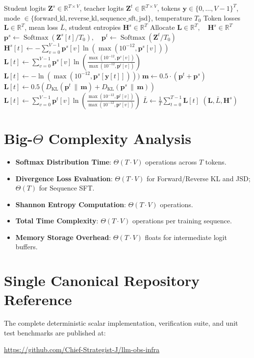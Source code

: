 \documentclass[11pt,a4paper]{article}
\theoremstyle{definition}
\begin{document}
\begin{algorithm}[H]
\caption{Autoregressive Sequence Distillation Stepwise Loss}
\begin{algorithmic}[1]
\Require Student logits $\mathbf{Z}^s \in \mathbb{R}^{T \times V}$, teacher logits $\mathbf{Z}^t \in \mathbb{R}^{T \times V}$, tokens $\mathbf{y} \in \{0, \dots, V-1\}^T$, mode $\in \{\text{forward\_kl}, \text{reverse\_kl}, \text{sequence\_sft}, \text{jsd}\}$, temperature $T_0$
\Ensure Token losses $\mathbf{L} \in \mathbb{R}^T$, mean loss $\bar{L}$, student entropies $\mathbf{H}^s \in \mathbb{R}^T$
\State Allocate $\mathbf{L} \in \mathbb{R}^T, \quad \mathbf{H}^s \in \mathbb{R}^T$
    \State $\mathbf{p}^s \gets \operatorname{Softmax}(\mathbf{Z}^s[t] / T_0), \quad \mathbf{p}^t \gets \operatorname{Softmax}(\mathbf{Z}^t / T_0)$
    \State $\mathbf{H}^s[t] \gets - \sum_{v=0}^{V-1} \mathbf{p}^s[v] \ln(\max(10^{-12}, \mathbf{p}^s[v]))$
        \State $\mathbf{L}[t] \gets \sum_{v=0}^{V-1} \mathbf{p}^s[v] \ln\left( \frac{\max(10^{-12}, \mathbf{p}^s[v])}{\max(10^{-12}, \mathbf{p}^t[v])} \right)$
        \State $\mathbf{L}[t] \gets - \ln(\max(10^{-12}, \mathbf{p}^s[\mathbf{y}[t]])))$
        \State $\mathbf{m} \gets 0.5 \cdot (\mathbf{p}^t + \mathbf{p}^s)$
        \State $\mathbf{L}[t] \gets 0.5 \left( D_{\text{KL}}(\mathbf{p}^t \,\|\, \mathbf{m}) + D_{\text{KL}}(\mathbf{p}^s \,\|\, \mathbf{m}) \right)$
    \Else
        \State $\mathbf{L}[t] \gets \sum_{v=0}^{V-1} \mathbf{p}^t[v] \ln\left( \frac{\max(10^{-12}, \mathbf{p}^t[v])}{\max(10^{-12}, \mathbf{p}^s[v])} \right)$
    \EndIf
\EndFor
\State $\bar{L} \gets \frac{1}{T} \sum_{t=0}^{T-1} \mathbf{L}[t]$
\State \Return $(\mathbf{L}, \bar{L}, \mathbf{H}^s)$
\end{algorithmic}
\end{algorithm}

\section{Big-$\Theta$ Complexity Analysis}

\begin{itemize}
    \item \textbf{Softmax Distribution Time}: $\Theta(T \cdot V)$ operations across $T$ tokens.
    \item \textbf{Divergence Loss Evaluation}: $\Theta(T \cdot V)$ for Forward/Reverse KL and JSD; $\Theta(T)$ for Sequence SFT.
    \item \textbf{Shannon Entropy Computation}: $\Theta(T \cdot V)$ operations.
    \item \textbf{Total Time Complexity}: $\Theta(T \cdot V)$ operations per training sequence.
    \item \textbf{Memory Storage Overhead}: $\Theta(T \cdot V)$ floats for intermediate logit buffers.
\end{itemize}

\section{Single Canonical Repository Reference}

The complete deterministic scalar implementation, verification suite, and unit test benchmarks are published at:
\begin{center}
\url{https://github.com/Chief-Strategist-J/llm-obs-infra}
\end{center}
\end{document}
